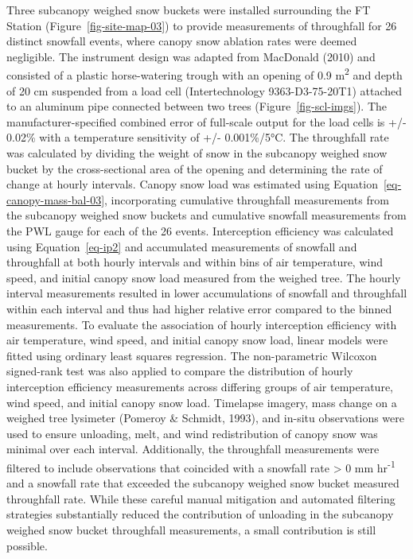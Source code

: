 \documentclass[
  letterpaper,
]{tex/uofsthesis-cs}
\begin{document}
Three subcanopy weighed snow buckets were installed surrounding the FT
Station (Figure~\ref{fig-site-map-03}) to provide measurements of
throughfall for 26 distinct snowfall events, where canopy snow ablation
rates were deemed negligible. The instrument design was adapted from
MacDonald (2010) and consisted of a plastic horse-watering trough with
an opening of 0.9 m\textsuperscript{2} and depth of 20 cm suspended from
a load cell (Intertechnology 9363-D3-75-20T1) attached to an aluminum
pipe connected between two trees (Figure~\ref{fig-scl-imgs}). The
manufacturer-specified combined error of full-scale output for the load
cells is +/- 0.02\% with a temperature sensitivity of +/- 0.001\%/5°C.
The throughfall rate was calculated by dividing the weight of snow in
the subcanopy weighed snow bucket by the cross-sectional area of the
opening and determining the rate of change at hourly intervals. Canopy
snow load was estimated using Equation~\ref{eq-canopy-mass-bal-03},
incorporating cumulative throughfall measurements from the subcanopy
weighed snow buckets and cumulative snowfall measurements from the PWL
gauge for each of the 26 events. Interception efficiency was calculated
using Equation~\ref{eq-ip2} and accumulated measurements of snowfall and
throughfall at both hourly intervals and within bins of air temperature,
wind speed, and initial canopy snow load measured from the weighed tree.
The hourly interval measurements resulted in lower accumulations of
snowfall and throughfall within each interval and thus had higher
relative error compared to the binned measurements. To evaluate the
association of hourly interception efficiency with air temperature, wind
speed, and initial canopy snow load, linear models were fitted using
ordinary least squares regression. The non-parametric Wilcoxon
signed-rank test was also applied to compare the distribution of hourly
interception efficiency measurements across differing groups of air
temperature, wind speed, and initial canopy snow load. Timelapse
imagery, mass change on a weighed tree lysimeter (Pomeroy \& Schmidt,
1993), and in-situ observations were used to ensure unloading, melt, and
wind redistribution of canopy snow was minimal over each interval.
Additionally, the throughfall measurements were filtered to include
observations that coincided with a snowfall rate \textgreater{} 0 mm
hr\textsuperscript{-1} and a snowfall rate that exceeded the subcanopy
weighed snow bucket measured throughfall rate. While these careful
manual mitigation and automated filtering strategies substantially
reduced the contribution of unloading in the subcanopy weighed snow
bucket throughfall measurements, a small contribution is still possible.
\end{document}
